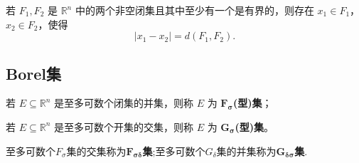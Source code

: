 \documentclass[../../main.tex]{subfiles}%
\begin{document}
\begin{corollary}
若 \(F_1,F_2\) 是 \(\mathbb{R}^n\) 中的两个非空闭集且其中至少有一个是有界的，则存在 \(x_1\in F_1\)，\(x_2\in F_2\)，使得
\[
|x_1 - x_2| = d(F_1,F_2).
\] 
\end{corollary}


\subsection{Borel集}

\begin{definition}\label{definition:F_sigma,G_delta集}
若 $E \subseteq \mathbb{R}^n$ 是至多可数个闭集的并集，则称 $E$ 为 $\boldsymbol{F}_{\boldsymbol{\sigma }}$\textbf{(型)集}；

若 $E \subseteq \mathbb{R}^n$ 是至多可数个开集的交集，则称 $E$ 为 $\boldsymbol{G}_{\boldsymbol{\sigma }}$\textbf{(型)集}。

至多可数个$F_{\sigma}$集的交集称为$\boldsymbol{F_{\sigma\delta}}$\textbf{集};至多可数个$G_{\delta}$集的并集称为$\boldsymbol{G_{\delta\sigma}}$\textbf{集}.
\end{definition}
\end{document}
